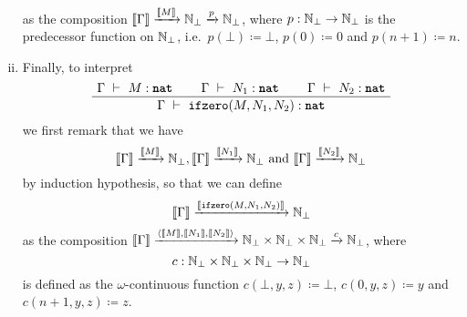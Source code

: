 \begin{definition}
\begin{enumerate}[(i)]
\[    \]
    as the composition
    \(\llbracket\Gamma\rrbracket \xrightarrow{\llbracket M\rrbracket} \mathbb N_\bot \xrightarrow{p}
    \mathbb N_\bot\), where \(p : \mathbb N_\bot \to \mathbb N_\bot\) is the predecessor
    function on \(\mathbb N_\bot\), i.e.\ \(p(\bot) \coloneqq \bot\),
    \(p(0) \coloneqq 0\) and \(p(n+1) \coloneqq n\).
  \item
    Finally, to interpret
    \[
      \def\fCenter{\ \vdash\ }
      \Axiom$\Gamma \fCenter M : \pcfnat$
      \Axiom$\Gamma \fCenter N_1 : \pcfnat$
      \Axiom$\Gamma \fCenter N_2 : \pcfnat$
      \TrinaryInf$\Gamma \fCenter \pcfifz(M,N_1,N_2) : \pcfnat$
      \DisplayProof
    \]
    we first remark that we have
    \[
      \llbracket\Gamma\rrbracket \xrightarrow{\llbracket M\rrbracket} \mathbb N_\bot,
      \llbracket\Gamma\rrbracket \xrightarrow{\llbracket N_1\rrbracket} \mathbb N_\bot \text{ and }
      \llbracket\Gamma\rrbracket \xrightarrow{\llbracket N_2\rrbracket} \mathbb N_\bot
    \]
    by induction hypothesis, so that we can define
    \[
      \llbracket\Gamma\rrbracket \xrightarrow{\llbracket\operatorname{\texttt{ifzero}}(M,N_1,N_2)\rrbracket} \mathbb N_\bot
    \]
    as the composition
    \(\llbracket\Gamma\rrbracket
    \xrightarrow{\langle{\llbracket M\rrbracket,\llbracket N_1\rrbracket,\llbracket N_2\rrbracket}\rangle}
    {{\mathbb N_\bot} \times {\mathbb N_\bot} \times {\mathbb N_\bot}} \xrightarrow{c}
    \mathbb N_\bot\), where
    \[
      c : \mathbb N_\bot \times \mathbb N_\bot \times \mathbb N_\bot \to \mathbb N_\bot
    \] is defined as the \(\omega\)-continuous function
    \(c(\bot,y,z) \coloneqq \bot\), \(c(0,y,z) \coloneqq y\) and
    \(c(n+1,y,z) \coloneqq z\).
  \end{enumerate}
\end{definition}


